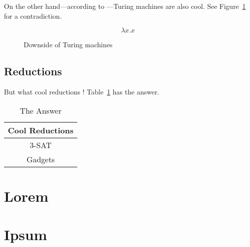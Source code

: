 \documentclass[doublespace]{rackham-thesis}
\begin{document}
On the other hand---according to \textcite{turing}---Turing machines are also cool.
See Figure~\ref{fig:comp} for a contradiction.
\lipsum[4]

\begin{figure}
    \centering
    {
        \Huge
        \begin{equation*}
            \lambda x . x
        \end{equation*}
    }
    \caption{Downside of Turing machines}
    \label{fig:comp}
\end{figure}


\section{Reductions}

But what cool reductions \parencite{cook}!
Table~\ref{tab:red} has the answer.
\lipsum[5-7]

\begin{table}
    \centering
    \caption{The Answer}
    \begin{tabular}{c} \toprule
        Cool Reductions \\ \midrule
        3-SAT \\
        Gadgets \\ \bottomrule
    \end{tabular}
    \label{tab:red}
\end{table}

\appendix

\chapter{Lorem}
\lipsum[8-13]

\chapter{Ipsum}
\lipsum[14]

\printbibliography
\end{document}
